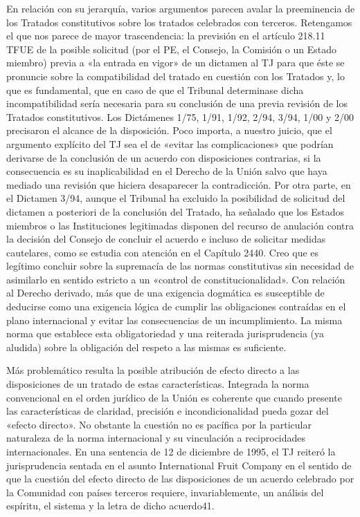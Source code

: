 \documentclass[10pt,a4paper]{article}
\begin{document}
En relación con su jerarquía, varios argumentos parecen avalar la preeminencia de los Tratados constitutivos sobre los tratados celebrados con terceros. Retengamos el que nos parece de mayor trascendencia: la previsión en el artículo 218.11 TFUE de la posible solicitud (por el PE, el Consejo, la Comisión o un Estado miembro) previa a «la entrada en vigor» de un dictamen al TJ para que éste se pronuncie sobre la compatibilidad del tratado en cuestión con los Tratados y, lo que es fundamental, que en caso de que el Tribunal determinase dicha incompatibilidad sería necesaria para su conclusión de una previa revisión de los Tratados constitutivos. Los Dictámenes 1/75, 1/91, 1/92, 2/94, 3/94, 1/00 y 2/00 precisaron el alcance de la disposición. Poco importa, a nuestro juicio, que el argumento explícito del TJ sea el de «evitar las complicaciones» que podrían derivarse de la conclusión de un acuerdo con disposiciones contrarias, si la consecuencia es su inaplicabilidad en el Derecho de la Unión salvo que haya mediado una revisión que hiciera desaparecer la contradicción. Por otra parte, en el Dictamen 3/94, aunque el Tribunal ha excluido la posibilidad de solicitud del dictamen a posteriori de la conclusión del Tratado, ha señalado que los Estados miembros o las Instituciones legitimadas disponen del recurso de anulación contra la decisión del Consejo de concluir el acuerdo e incluso de solicitar medidas cautelares, como se estudia con atención en el Capítulo 2440. Creo que es legítimo concluir sobre la supremacía de las normas constitutivas sin necesidad de asimilarlo en sentido estricto a un «control de constitucionalidad». Con relación al Derecho derivado, más que de una exigencia dogmática es susceptible de deducirse como una exigencia lógica de cumplir las obligaciones contraídas en el plano internacional y evitar las consecuencias de un incumplimiento. La misma norma que establece esta obligatoriedad y una reiterada jurisprudencia (ya aludida) sobre la obligación del respeto a las mismas es suficiente. 

Más problemático resulta la posible atribución de efecto directo a las disposiciones de un tratado de estas características. Integrada la norma convencional en el orden jurídico de la Unión es coherente que cuando presente las características de claridad, precisión e incondicionalidad pueda gozar del «efecto directo». No obstante la cuestión no es pacífica por la particular naturaleza de la norma internacional y su vinculación a reciprocidades internacionales. En una sentencia de 12 de diciembre de 1995, el TJ reiteró la jurisprudencia sentada en el asunto International Fruit Company en el sentido de que la cuestión del efecto directo de las disposiciones de un acuerdo celebrado por la Comunidad con países terceros requiere, invariablemente, un análisis del espíritu, el sistema y la letra de dicho acuerdo41. 
\end{document}
